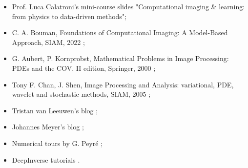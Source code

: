 \begin{itemize}
    \item Prof. Luca Calatroni's mini-course slides "Computational imaging \& learning: from physics to data-driven methods";
    \item C. A. Bouman, Foundations of Computational Imaging: A Model-Based Approach, SIAM, 2022 \cite{bouman_foundations_2022};
    \item G. Aubert, P. Kornprobst, Mathematical Problems in Image Processing: PDEs and the COV, II edition, Springer, 2000 \cite{aubert_mathematical_2008};
    \item Tony F. Chan, J. Shen, Image Processing and Analysis: variational, PDE, wavelet and stochastic methods, SIAM, 2005 \cite{chan_image_2005};
    \item Tristan van Leeuwen's blog \cite{van_leeuwen_1_nodate};
    \item Johannes Meyer's blog \cite{meyer_computational_nodate};
    \item Numerical tours by G. Peyré \cite{peyre_numerical_nodate};
    \item DeepInverse tutorials \cite{deepinverse_examples_nodate}.
\end{itemize}